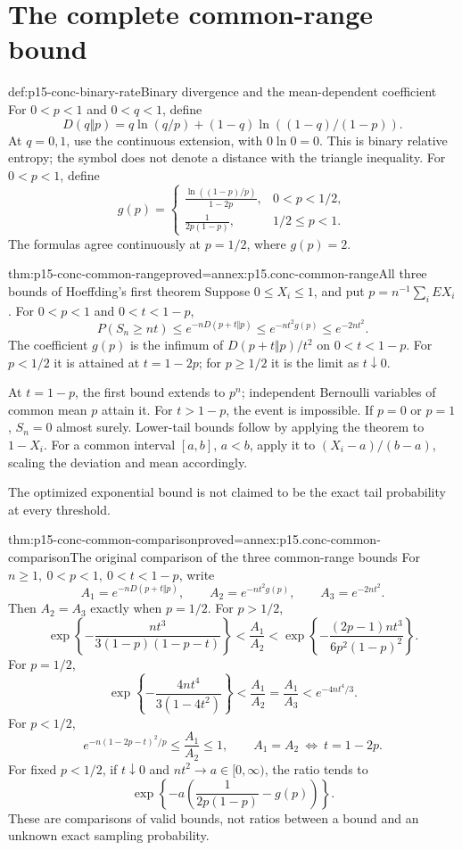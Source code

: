 \section{The complete common-range bound}

\begin{hbdefinition}{def:p15-conc-binary-rate}{Binary divergence and the mean-dependent coefficient}
For \(0<p<1\) and \(0<q<1\), define
\[
 D(q\Vert p)=q\ln(q/p)+(1-q)\ln((1-q)/(1-p)).
\]
At \(q=0,1\), use the continuous extension, with \(0\ln0=0\).
This is binary relative entropy; the symbol does not denote a
distance with the triangle inequality.
For \(0<p<1\), define
\[
 g(p)=
 \begin{cases}
 \displaystyle\frac{\ln((1-p)/p)}{1-2p},&0<p<1/2,\\[4pt]
 \displaystyle\frac{1}{2p(1-p)},&1/2\leq p<1.
 \end{cases}
\]
The formulas agree continuously at \(p=1/2\), where \(g(p)=2\).
\end{hbdefinition}

\begin{hbtheorem}{thm:p15-conc-common-range}{proved=annex:p15.conc-common-range}{All three bounds of Hoeffding's first theorem}
Suppose \(0\leq X_i\leq1\), and put
\(p=n^{-1}\sum_i EX_i\). For \(0<p<1\) and \(0<t<1-p\),
\[
 P(S_n\geq nt)
 \leq e^{-nD(p+t\Vert p)}
 \leq e^{-nt^2g(p)}
 \leq e^{-2nt^2}.
\]
The coefficient \(g(p)\) is the infimum of
\(D(p+t\Vert p)/t^2\) on \(0<t<1-p\).
For \(p<1/2\) it is attained at \(t=1-2p\);
for \(p\geq1/2\) it is the limit as \(t\downarrow0\).

At \(t=1-p\), the first bound extends to \(p^n\);
independent Bernoulli variables of common mean \(p\) attain it.
For \(t>1-p\), the event is impossible.
If \(p=0\) or \(p=1\), \(S_n=0\) almost surely.
Lower-tail bounds follow by applying the theorem to \(1-X_i\).
For a common interval \([a,b]\), \(a<b\), apply it to
\((X_i-a)/(b-a)\), scaling the deviation and mean accordingly.

The optimized exponential bound is not claimed to be the exact
tail probability at every threshold.
\end{hbtheorem}

\begin{hbtheorem}{thm:p15-conc-common-comparison}{proved=annex:p15.conc-common-comparison}{The original comparison of the three common-range bounds}
For \(n\geq1,\ 0<p<1,\ 0<t<1-p\), write
\[
 A_1=e^{-nD(p+t\Vert p)},\qquad
 A_2=e^{-nt^2g(p)},\qquad A_3=e^{-2nt^2}.
\]
Then \(A_2=A_3\) exactly when \(p=1/2\).
For \(p>1/2\),
\[
 \exp\!\left\{-\frac{nt^3}{3(1-p)(1-p-t)}\right\}
 <\frac{A_1}{A_2}<
 \exp\!\left\{-\frac{(2p-1)nt^3}{6p^2(1-p)^2}\right\}.
\]
For \(p=1/2\),
\[
 \exp\!\left\{-\frac{4nt^4}{3(1-4t^2)}\right\}
 <\frac{A_1}{A_2}=\frac{A_1}{A_3}
 <e^{-4nt^4/3}.
\]
For \(p<1/2\),
\[
       e^{-n(1-2p-t)^2/p}\leq\frac{A_1}{A_2}\leq1,
 \qquad A_1=A_2\ \Longleftrightarrow\ t=1-2p.
\]
For fixed \(p<1/2\), if \(t\downarrow0\) and
\(nt^2\to a\in[0,\infty)\), the ratio tends to
\[
       \exp\!\left\{-a\left(\frac1{2p(1-p)}-g(p)\right)\right\}.
\]
These are comparisons of valid bounds, not ratios between a bound
and an unknown exact sampling probability.
\end{hbtheorem}

